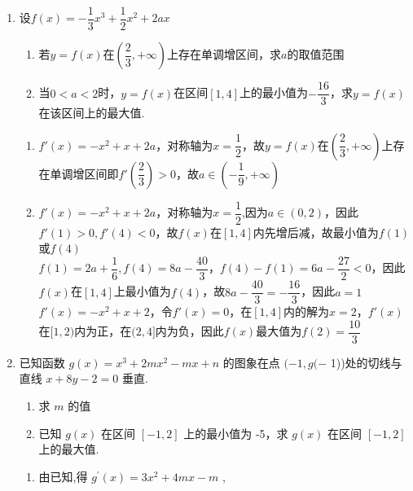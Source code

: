 \begin{enumerate}
\begin{enumerate}
        \item 设$f(x) = -\dfrac{1}{3}x^3 + \dfrac{1}{2}x^2+2ax$
        \begin{enumerate}
            \item 若$y = f(x)$在$\left(\dfrac{2}{3}, +\infty\right)$上存在单调增区间，求$a$的取值范围
            \item 当$0 < a < 2$时，$y = f(x)$在区间$[1, 4]$上的最小值为$-\dfrac{16}{3}$，求$y = f(x)$在该区间上的最大值.
        \end{enumerate}
        \begin{jieda}
            \begin{enumerate}
                \item $f'(x) = -x^2+x+2a$，对称轴为$x = \dfrac{1}{2}$，故$y = f(x)$在$\left(\dfrac{2}{3}, +\infty\right)$上存在单调增区间即$f'\left(\dfrac{2}{3}\right) > 0 $，故$a \in \left(-\dfrac{1}{9}, +\infty\right)$
                \item $f'(x) = -x^2+x+2a$，对称轴为$x = \dfrac{1}{2}$,因为$a \in (0, 2)$，因此$f'(1) > 0, f'(4) < 0$，故$f(x)$在$[1, 4]$内先增后减，故最小值为$f(1)$或$f(4)$ \\
                $f(1) = 2a+\dfrac{1}{6}, f(4) = 8a-\dfrac{40}{3}$，$f(4)-f(1) = 6a-\dfrac{27}{2} < 0$，因此$f(x)$在$[1, 4]$上最小值为$f(4)$，故$8a-\dfrac{40}{3} = -\dfrac{16}{3}$，因此$a = 1$ \\
                $f'(x) = -x^2+x+2$，令$f'(x) = 0$，在$[1, 4]$内的解为$x = 2$，$f'(x)$在$[1, 2)$内为正，在$(2, 4]$内为负，因此$f(x)$最大值为$f(2) = \dfrac{10}{3}$
            \end{enumerate}
        \end{jieda}
        
        \item 已知函数 $g\left( x\right)  = {x}^{3} + {2m}{x}^{2} - {mx} + n$ 的图象在点 $( - 1,g( -$ 1))处的切线与直线 $x + {8y} - 2 = 0$ 垂直.
        \begin{enumerate}
            \item 求 $m$ 的值
            \item 已知 $g\left( x\right)$ 在区间 $\left\lbrack  {-1,2}\right\rbrack$ 上的最小值为 -5，求 $g\left( x\right)$ 在区间 $\left\lbrack  {-1,2}\right\rbrack$ 上的最大值.
        \end{enumerate}
        \begin{jieda}
            \begin{enumerate}
                \item 由已知,得 ${g}^{\prime }\left( x\right)  = 3{x}^{2} + {4mx} - m$ ,
                

\end{enumerate}
\end{jieda}
\end{enumerate}
\end{enumerate}
